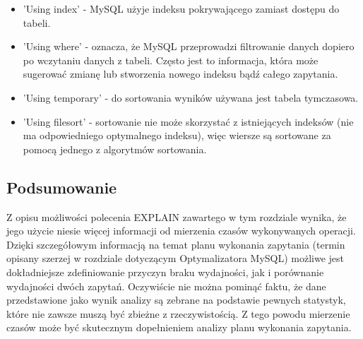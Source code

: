 \begin{itemize}
	\item 'Using index' - MySQL użyje indeksu pokrywającego zamiast dostępu do tabeli.
	\item 'Using where' - oznacza, że MySQL przeprowadzi filtrowanie danych dopiero po wczytaniu danych z tabeli. Często jest to informacja, która może sugerować zmianę lub stworzenia nowego indeksu bądź całego zapytania.
	\item 'Using temporary' - do sortowania wyników używana jest tabela tymczasowa.
	\item 'Using filesort' - sortowanie nie może skorzystać z istniejących indeksów (nie ma odpowiedniego optymalnego indeksu), więc wiersze są sortowane za pomocą jednego z algorytmów sortowania.
	
\end{itemize}

\subsection{Podsumowanie}


Z opisu możliwości polecenia EXPLAIN zawartego w tym rozdziale wynika, że jego użycie niesie więcej informacji od mierzenia czasów wykonywanych operacji. Dzięki szczegółowym informacją na temat planu wykonania zapytania (termin opisany szerzej w rozdziale dotyczącym Optymalizatora MySQL) możliwe jest dokładniejsze zdefiniowanie przyczyn braku wydajności, jak i porównanie wydajności dwóch zapytań. Oczywiście nie można pominąć faktu, że dane przedstawione jako wynik analizy są zebrane na podstawie pewnych statystyk, które nie zawsze muszą być zbieżne z rzeczywistością. Z tego powodu mierzenie czasów może być skutecznym dopełnieniem analizy planu wykonania zapytania.